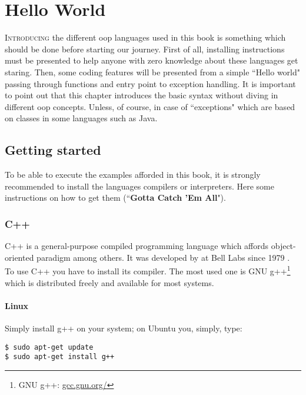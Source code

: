 \documentclass{KodeBookAr}
\begin{document}
\fi

\chapter{Hello World}

\begin{introduction}
	 
	\lettrine{I}{ntroducing} the different \ac{oop} languages used in this book is something which should be done before starting our journey.
	First of all, installing instructions must be presented to help anyone with zero knowledge about these languages get staring. 
	Then, some coding features will be presented from a simple ``Hello world" passing through functions and entry point to exception handling. 
	It is important to point out that this chapter introduces the basic syntax without diving in different \ac{oop} concepts.
	Unless, of course, in case of ``exceptions" which are based on classes in some languages such as Java.
\end{introduction}


\section{Getting started}

To be able to execute the examples afforded in this book, it is strongly recommended to install the languages compilers or interpreters.
Here some instructions on how to get them (``\textbf{Gotta Catch 'Em All}").

\subsection{C++}


C++ is a general-purpose compiled programming language which affords object-oriented paradigm among others. 
It was developed by  at Bell Labs since 1979 \citep{1993-stroustrup}.
To use C++ you have to install its compiler. 
The most used one is GNU g++\footnote{GNU g++: \url{gcc.gnu.org/}} which is distributed freely and available for most systems.

\subsubsection{Linux}
Simply install g++ on your system; on Ubuntu you, simply, type:
\begin{lstlisting}[style=shellStyle]
$ sudo apt-get update
$ sudo apt-get install g++
\end{lstlisting}
\end{document}
